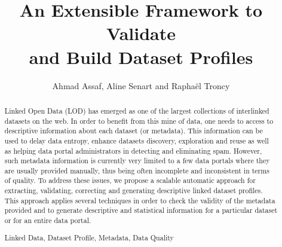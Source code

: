 \documentclass[runningheads,a4paper]{llncs}
\newcommand{\keywords}[1]{\par\addvspace\baselineskip
\noindent\keywordname\enspace\ignorespaces#1}
\begin{document}
\title{An Extensible Framework to Validate\\ and Build Dataset Profiles}

\author{Ahmad Assaf, Aline Senart and Rapha\"{e}l Troncy }



\maketitle


\begin{abstract}
Linked Open Data (LOD) has emerged as one of the largest collections of interlinked datasets on the web. In order to benefit from this mine of data, one needs to access to descriptive information about each dataset (or metadata). This information can be used to delay data entropy, enhance datasets discovery, exploration and reuse as well as helping data portal administrators in detecting and eliminating spam. However, such metadata information is currently very limited to a few data portals where they are usually provided manually, thus being often incomplete and inconsistent in terms of quality. To address these issues, we propose a scalable automatic approach for extracting, validating, correcting and generating descriptive linked dataset profiles. This approach applies several techniques in order to check the validity of the metadata provided and to generate descriptive and statistical information for a particular dataset or for an entire data portal.


\keywords{Linked Data, Dataset Profile, Metadata, Data Quality}
\end{abstract}
\end{document}
